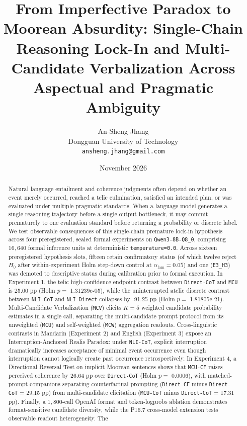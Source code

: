 \documentclass[11pt,a4paper]{article}
\begin{document}
\title{From Imperfective Paradox to Moorean Absurdity: Single-Chain Reasoning Lock-In and Multi-Candidate Verbalization Across Aspectual and Pragmatic Ambiguity}
\author{An-Sheng Jhang \\ Dongguan University of Technology \\ \texttt{ansheng.jhang@gmail.com}}
\date{November 2026}
\maketitle

\begin{abstract}\noindent

Natural language entailment and coherence judgments often depend on whether an event merely occurred, reached a telic culmination, satisfied an intended plan, or was evaluated under multiple pragmatic standards. When a language model generates a single reasoning trajectory before a single-output bottleneck, it may commit prematurely to one evaluation standard before returning a probability or discrete label. We test observable consequences of this single-chain premature lock-in hypothesis across four preregistered, sealed formal experiments on \texttt{Qwen3-\allowbreak{}8B-\allowbreak{}Q8\_\allowbreak{}0}, comprising $16{,}640$ formal inference units at deterministic \texttt{temperature=\allowbreak{}0.0}. Across sixteen preregistered hypothesis slots, fifteen retain confirmatory status (of which twelve reject $H_0$ after within-experiment Holm step-down control at $\alpha_{\text{fam}}=0.05$) and one (\texttt{E3\_\allowbreak{}H3}) was demoted to descriptive status during calibration prior to formal execution. In Experiment 1, the telic high-confidence endpoint contrast between \texttt{Direct-\allowbreak{}CoT} and \texttt{MCU} is 25.00 pp (Holm $p=$ 1.31239e-05), while the uninterrupted atelic discrete contrast between \texttt{NLI-\allowbreak{}CoT} and \texttt{NLI-\allowbreak{}Direct} collapses by -91.25 pp (Holm $p=$ 1.81805e-21). Multi-Candidate Verbalization (\texttt{MCV}) elicits $K=5$ weighted candidate probability estimates in a single call, separating the multi-candidate prompt protocol from its unweighted (\texttt{MCU}) and self-weighted (\texttt{MCW}) aggregation readouts. Cross-linguistic contrasts in Mandarin (Experiment 2) and English (Experiment 3) expose an Interruption-Anchored Realis Paradox: under \texttt{NLI-\allowbreak{}CoT}, explicit interruption dramatically increases acceptance of minimal event occurrence even though interruption cannot logically create past occurrence retrospectively. In Experiment 4, a Directional Reversal Test on implicit Moorean sentences shows that \texttt{MCU-\allowbreak{}CF} raises perceived coherence by 26.64 pp over \texttt{Direct-\allowbreak{}CoT} (Holm $p=$ 0.0006), with matched-prompt companions separating counterfactual prompting (\texttt{Direct-\allowbreak{}CF} minus \texttt{Direct-\allowbreak{}CoT} = 29.15 pp) from multi-candidate elicitation (\texttt{MCU-\allowbreak{}CoT} minus \texttt{Direct-\allowbreak{}CoT} = 17.31 pp). Finally, a $1{,}800$-call OpenAI format and token-logprobs ablation demonstrates format-sensitive candidate diversity, while the P16.7 cross-model extension tests observable readout heterogeneity. The 
\end{abstract}
\end{document}
